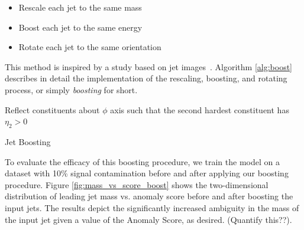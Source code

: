 \documentclass[12pt, a4paper]{article}
\begin{document}
\begin{itemize}
	\item{Rescale each jet to the same mass}
	\item{Boost each jet to the same energy}
	\item{Rotate each jet to the same orientation}
\end{itemize}

This method is inspired by a study based on jet images~\cite{roy2020robust}. Algorithm \ref{alg:boost} describes in detail the implementation of the rescaling, boosting, and rotating process, or simply \textit{boosting} for short. 

\begin{algorithm}[H]
\SetAlgoLined
 
Reflect constituents about $\phi$ axis such that the second hardest constituent has $\eta_{2} > 0$
 
\caption{Jet Boosting}
\label{alg:boost}
\end{algorithm}





To evaluate the efficacy of this boosting procedure, we train the model on a dataset with 10\% signal contamination before and after applying our boosting procedure. Figure \ref{fig:mass_vs_score_boost} shows the two-dimensional distribution of leading jet mass vs. anomaly score before and after boosting the input jets. The results depict the significantly increased ambiguity in the mass of the input jet given a value of the Anomaly Score, as desired. (Quantify this??).
\end{document}
